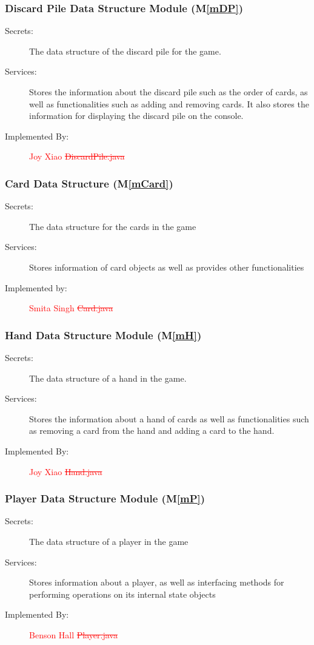 \documentclass[12pt, titlepage]{article}
\newcommand{\mref}[1]{M\ref{#1}}
\begin{document}
\subsubsection{Discard Pile Data Structure Module (\mref{mDP})}
\begin{description}
    \item[Secrets:]The data structure of the discard pile for the game.
    \item[Services:]Stores the information about the discard pile such as the order of cards, as well as functionalities such as adding and removing cards. It also stores the information for displaying the discard pile on the console. 
    \item[Implemented By:] \textcolor{red}{Joy Xiao} \textcolor{red}{\sout{DiscardPile.java}}
\end{description}

\subsubsection{Card Data Structure (\mref{mCard})}
\begin{description}
    \item[Secrets:]The data structure for the cards in the game
    \item[Services:]Stores information of card objects as well as provides other functionalities
    \item [Implemented by:]\textcolor{red}{Smita Singh \sout{Card.java}}
\end{description}

\subsubsection{Hand Data Structure Module (\mref{mH})}
\begin{description}
    \item[Secrets:] The data structure of a hand in the game.
    \item[Services:] Stores the information about a hand of cards as well as functionalities such as removing a card from the hand and adding a card to the hand.
    \item[Implemented By:] \textcolor{red}{Joy Xiao} \textcolor{red}{\sout{Hand.java}}
\end{description}


\subsubsection{Player Data Structure Module (\mref{mP})}
\begin{description}
    \item[Secrets:]The data structure of a player in the game
    \item[Services:]Stores information about a player, as well as interfacing methods for performing operations on its internal state objects
    \item[Implemented By:]\textcolor{red}{Benson Hall \sout{Player.java}}
\end{description}
\end{document}
